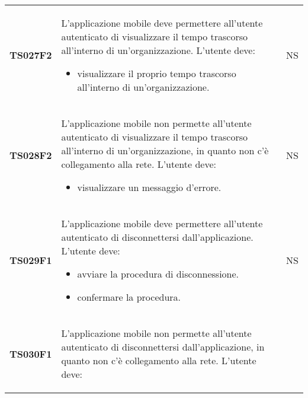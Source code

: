 \documentclass[../piano-di-qualifica.tex]{subfiles}
\begin{document}
\begin{longtable}[H]{>{\centering\bfseries}m{3cm} >{}m{10cm} >{\centering\arraybackslash}m{3cm}}
  TS027F2            & L'applicazione mobile deve permettere all'utente autenticato di visualizzare il tempo trascorso all'interno di un'organizzazione. \newline
  L'utente deve:
  \begin{itemize}
    \item visualizzare il proprio tempo trascorso all'interno di un'organizzazione.
  \end{itemize}
                     & NS                                                                                                                                                                                                                                                               \\
  TS028F2            & L'applicazione mobile non permette all'utente autenticato di visualizzare il tempo trascorso all'interno di un'organizzazione, in quanto non c'è collegamento alla rete. \newline
  L'utente deve:
  \begin{itemize}
    \item visualizzare un messaggio d'errore.
  \end{itemize}
                     & NS                                                                                                                                                                                                                                                               \\
  TS029F1            & L'applicazione mobile deve permettere all'utente autenticato di disconnettersi dall'applicazione. \newline
  L'utente deve:
  \begin{itemize}
    \item avviare la procedura di disconnessione.
    \item confermare la procedura.
  \end{itemize}
                     & NS                                                                                                                                                                                                                                                               \\
  TS030F1            & L'applicazione mobile non permette all'utente autenticato di disconnettersi dall'applicazione, in quanto non c'è collegamento alla rete. \newline
  L'utente deve:
  \begin{itemize}

\end{itemize}
\end{longtable}
\end{document}
